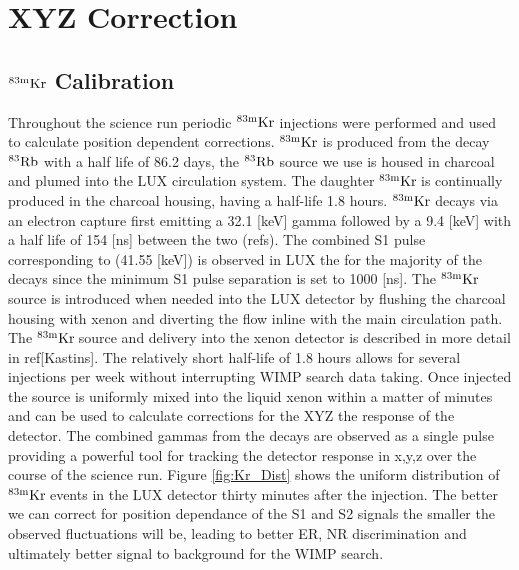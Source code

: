 
\renewcommand{\thechapter}{3}
\newcommand{\KrCal}{$\rm^{83m}Kr \: $}


\chapter{XYZ Correction}
\label{Ch:3}

\section{$\rm^{83m}Kr$ Calibration}

Throughout the science run periodic $\rm^{83m}Kr$ injections were performed and used to calculate position dependent corrections. $\rm ^{83m}Kr$ is produced from the decay $\rm^{83}Rb$ with a half life of 86.2 days, the $\rm^{83}Rb$ source we use is housed in charcoal and plumed into the LUX circulation system. The daughter \KrCal is continually produced in the charcoal housing, having a half-life 1.8 hours. $\rm^{83m}Kr$ decays via an electron capture first emitting a 32.1 [keV] gamma followed by a 9.4 [keV] with a half life of 154 [ns] between the two (refs). The combined S1 pulse corresponding to (41.55 [keV]) is observed in LUX the for the majority of the decays since the minimum S1 pulse separation is set to 1000 [ns]. The \KrCal source is introduced when needed into the LUX detector by flushing the charcoal housing with xenon and diverting the flow inline with the main circulation path. The \KrCal source and delivery into the xenon detector is described in more detail in ref[Kastins]. The relatively short half-life of 1.8 hours allows for several injections per week without interrupting WIMP search data taking. Once injected the source is uniformly mixed into the liquid xenon within a matter of minutes and can be used to calculate corrections for the XYZ the response of the detector. The combined gammas from the decays are observed as a single pulse providing a powerful tool for tracking the detector response in x,y,z over the course of the science run. Figure \ref{fig:Kr_Dist} shows the uniform distribution of \KrCal events in the LUX detector thirty minutes after the injection. The better we can correct for position dependance of the S1 and S2 signals the smaller the observed fluctuations will be, leading to better ER, NR discrimination and ultimately better signal to background for the WIMP search.


